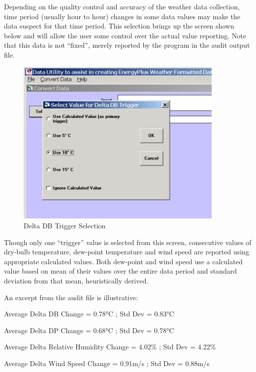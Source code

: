 Depending on the quality control and accuracy of the weather data collection, time period (usually hour to hour) changes in some data values may make the data suspect for that time period. This selection brings up the screen shown below and will allow the user some control over the actual value reporting. Note that this data is not ``fixed'', merely reported by the program in the audit output file.

\begin{figure}[hbtp] %
\centering
\includegraphics[width=0.9\textwidth, height=0.9\textheight, keepaspectratio=true]{media/image002.jpg}
\caption{Delta DB Trigger Selection \protect \label{fig:delta-db-trigger-selection}}
\end{figure}

Though only one ``trigger'' value is selected from this screen, consecutive values of dry-bulb temperature, dew-point temperature and wind speed are reported using appropriate calculated values. Both dew-point and wind speed use a calculated value based on mean of their values over the entire data period and standard deviation from that mean, heuristically derived.

An excerpt from the audit file is illustrative:

Average Delta DB Change = 0.78°C ; Std Dev = 0.83°C

Average Delta DP Change = 0.68°C ; Std Dev = 0.78°C

Average Delta Relative Humidity Change = 4.02\% ; Std Dev = 4.22\%

Average Delta Wind Speed Change = 0.91m/s ; Std Dev = 0.88m/s

